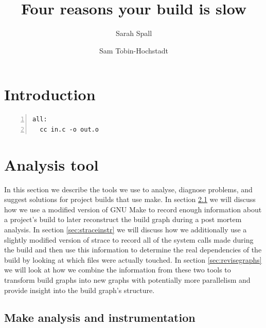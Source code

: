 \documentclass[sigplan,10pt,review,authorversion]{acmart}\settopmatter{printfolios=true,printccs=false,printacmref=false}
\title{Four reasons your build is slow}
\author{Sarah Spall}
\affiliation{Indiana University}
\author{Sam Tobin-Hochstadt}
\affiliation{Indiana University}
\begin{document}
\maketitle

\section{Introduction}

\begin{Verbatim}[commandchars=\\\{\},codes={\catcode`$=3\catcode`^=7\catcode`_=8},fontsize=\small,numbers=left,xleftmargin=5mm]
all:
  cc in.c -o out.o
\end{Verbatim}
  


\section{Analysis tool}
\label{sec:analysis}
In this section we describe the tools we use to analyse, diagnose problems, and suggest solutions
for project builds that use make.  In section \ref{sec:makeanalysis} we will discuss how we use
a modified version of GNU Make to record enough information about a project's build to later
reconstruct the build graph during a post mortem analysis.  In section \ref{sec:straceinstr} we
will discuss how we additionally use a slightly modified version of strace to record all of the
system calls made during the build and then use this information to determine the real dependencies
of the build by looking at which files were actually touched. In section \ref{sec:revisegraphs} we
will look at how we combine the information from these two tools to transform build graphs into
new graphs with potentially more parallelism and provide insight into the build graph's structure.

\subsection{Make analysis and instrumentation}
\label{sec:makeanalysis}
\end{document}
